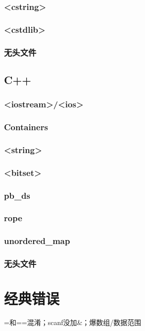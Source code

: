 \documentclass[10pt]{article}
\begin{document}
\subsubsection{<cstring>}

\subsubsection{<cstdlib>}

\subsubsection{无头文件}


\subsection{C++}
\subsubsection{<iostream>/<ios>}

\subsubsection{Containers}

\subsubsection{<string>}

%
\subsubsection{<bitset>}

%
\subsubsection{pb\_ds}

\subsubsection{rope}

\subsubsection{unordered\_map}

\subsubsection{无头文件}

\section{经典错误}
=和==混淆；scanf没加\&；爆数组/数据范围
\end{document}
